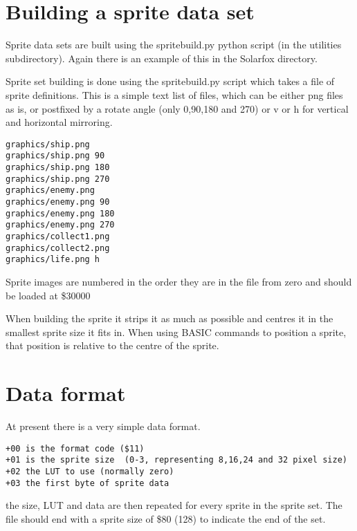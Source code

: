 \section{Building a sprite data set}
	
Sprite data sets are built using the spritebuild.py python script (in the utilities subdirectory). Again there is an example of this in the Solarfox directory.

Sprite set building is done using the spritebuild.py script which takes a file of sprite definitions. This is a simple text list of files, which can be either png files as is, or postfixed by a rotate angle (only 0,90,180 and 270) or v or h for vertical and horizontal mirroring.

\begin{verbatim}
graphics/ship.png
graphics/ship.png 90
graphics/ship.png 180
graphics/ship.png 270
graphics/enemy.png
graphics/enemy.png 90
graphics/enemy.png 180
graphics/enemy.png 270
graphics/collect1.png
graphics/collect2.png
graphics/life.png h
\end{verbatim}

Sprite images are numbered in the order they are in the file from zero and should be loaded at \$30000

When building the sprite it strips it as much as possible and centres it in the smallest sprite size it fits in. When using BASIC commands to position a sprite, that position is relative to the centre of the sprite.

\section{Data format}

At present there is a very simple data format. \

\begin{verbatim}
+00 is the format code ($11) 
+01 is the sprite size  (0-3, representing 8,16,24 and 32 pixel size) 
+02 the LUT to use (normally zero) 
+03 the first byte of sprite data 
\end{verbatim}

the size, LUT and data are then repeated for every sprite in the sprite set. The file should end with a sprite size of \$80 (128) to indicate the end of the set.


